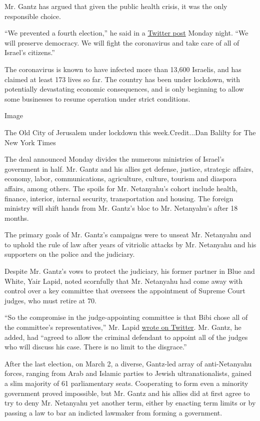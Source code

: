 Mr. Gantz has argued that given the public health crisis, it was the
only responsible choice.

``We prevented a fourth election,'' he said in a
\href{https://twitter.com/gantzbe/status/1252276044620607488?s=08}{Twitter
post} Monday night. ``We will preserve democracy. We will fight the
coronavirus and take care of all of Israel's citizens.''

The coronavirus is known to have infected more than 13,600 Israelis, and
has claimed at least 173 lives so far. The country has been under
lockdown, with potentially devastating economic consequences, and is
only beginning to allow some businesses to resume operation under strict
conditions.

Image

The Old City of Jerusalem under lockdown this week.Credit...Dan Balilty
for The New York Times

The deal announced Monday divides the numerous ministries of Israel's
government in half. Mr. Gantz and his allies get defense, justice,
strategic affairs, economy, labor, communications, agriculture, culture,
tourism and diaspora affairs, among others. The spoils for Mr.
Netanyahu's cohort include health, finance, interior, internal security,
transportation and housing. The foreign ministry will shift hands from
Mr. Gantz's bloc to Mr. Netanyahu's after 18 months.

The primary goals of Mr. Gantz's campaigns were to unseat Mr. Netanyahu
and to uphold the rule of law after years of vitriolic attacks by Mr.
Netanyahu and his supporters on the police and the judiciary.

Despite Mr. Gantz's vows to protect the judiciary, his former partner in
Blue and White, Yair Lapid, noted scornfully that Mr. Netanyahu had come
away with control over a key committee that oversees the appointment of
Supreme Court judges, who must retire at 70.

``So the compromise in the judge-appointing committee is that Bibi chose
all of the committee's representatives,'' Mr. Lapid
\href{https://twitter.com/yairlapid/status/1252261985556877312?s=20}{wrote
on Twitter}. Mr. Gantz, he added, had ``agreed to allow the criminal
defendant to appoint all of the judges who will discuss his case. There
is no limit to the disgrace.''

After the last election, on March 2, a diverse, Gantz-led array of
anti-Netanyahu forces, ranging from Arab and Islamic parties to Jewish
ultranationalists, gained a slim majority of 61 parliamentary seats.
Cooperating to form even a minority government proved impossible, but
Mr. Gantz and his allies did at first agree to try to deny Mr. Netanyahu
yet another term, either by enacting term limits or by passing a law to
bar an indicted lawmaker from forming a government.

